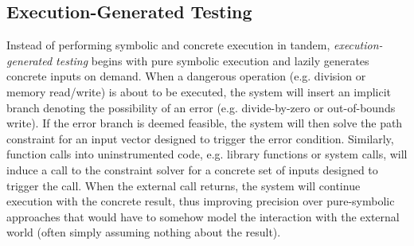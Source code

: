 \subsection{Execution-Generated Testing}
\label{sec-3-3}
Instead of performing symbolic and concrete execution in tandem,
\emph{execution-generated testing} \cite{cadar_execution_2005} begins
with pure symbolic execution and lazily generates concrete inputs on
demand.
%
When a dangerous operation (e.g. division or memory read/write) is about
to be executed, the system will insert an implicit branch denoting the
possibility of an error (e.g. divide-by-zero or out-of-bounds write).
%
If the error branch is deemed feasible, the system will then solve the
path constraint for an input vector designed to trigger the error
condition.
%
Similarly, function calls into uninstrumented code, e.g. library
functions or system calls, will induce a call to the constraint solver
for a concrete set of inputs designed to trigger the call.
%
When the external call returns, the system will continue execution with
the concrete result, thus improving precision over pure-symbolic
approaches that would have to somehow model the interaction with the
external world (often simply assuming nothing about the result).

